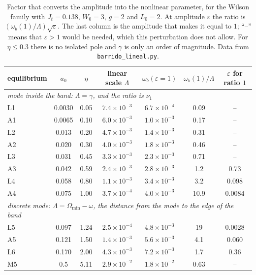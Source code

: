 \documentclass[11pt,a4paper]{article}
\begin{document}
\begin{table}[!htbp]
\centering
\small
\setlength{\tabcolsep}{4pt}
\begin{tabular}{lcccccc}
\toprule
equilibrium & $a_0$ & $\eta$ & linear scale $\Lambda$ & $\omega_b(\varepsilon=1)$ & $\omega_b(1)/\Lambda$ & $\varepsilon$ for ratio $1$\\
\midrule
\multicolumn{7}{l}{\emph{mode inside the band: $\Lambda=\gamma$, and the ratio is $\nu_1$}}\\
L1 & 0.0030 & 0.05 & $7.4\times10^{-3}$ & $6.7\times10^{-4}$ & 0.09 & --\\
A1 & 0.0065 & 0.10 & $6.0\times10^{-3}$ & $1.0\times10^{-3}$ & 0.17 & --\\
L2 & 0.013 & 0.20 & $4.7\times10^{-3}$ & $1.4\times10^{-3}$ & 0.31 & --\\
A2 & 0.020 & 0.30 & $4.0\times10^{-3}$ & $1.8\times10^{-3}$ & 0.46 & --\\
L3 & 0.031 & 0.45 & $3.3\times10^{-3}$ & $2.3\times10^{-3}$ & 0.71 & --\\
A3 & 0.042 & 0.59 & $2.4\times10^{-3}$ & $2.8\times10^{-3}$ & 1.2 & 0.73\\
L4 & 0.058 & 0.80 & $1.1\times10^{-3}$ & $3.4\times10^{-3}$ & 3.2 & 0.098\\
A4 & 0.075 & 1.00 & $3.7\times10^{-4}$ & $4.0\times10^{-3}$ & 10.9 & 0.0084\\
\midrule
\multicolumn{7}{l}{\emph{discrete mode: $\Lambda=\Omega_{\min}-\omega$, the distance from the mode to the edge of the band}}\\
L5 & 0.097 & 1.24 & $2.5\times10^{-4}$ & $4.8\times10^{-3}$ & 19 & 0.0028\\
A5 & 0.121 & 1.50 & $1.4\times10^{-3}$ & $5.6\times10^{-3}$ & 4.1 & 0.060\\
L6 & 0.170 & 2.00 & $4.3\times10^{-3}$ & $7.2\times10^{-3}$ & 1.7 & 0.36\\
M5 & 0.5 & 5.11 & $2.9\times10^{-2}$ & $1.8\times10^{-2}$ & 0.63 & --\\
\bottomrule
\end{tabular}
\caption{Factor that converts the amplitude into the nonlinear parameter, for the Wilson
family with $J_t=0.138$, $W_0=3$, $g=2$ and $L_0=2$. At amplitude $\varepsilon$ the ratio is
$(\omega_b(1)/\Lambda)\sqrt\varepsilon$. The last column is the amplitude that makes it equal
to $1$; ``--'' means that $\varepsilon>1$ would be needed, which this perturbation does not
allow. For $\eta\le0.3$ there is no isolated pole and $\gamma$ is only an order of
magnitude. Data from \texttt{barrido\_lineal.py}.}
\label{tab:techo}
\end{table}
\end{document}
